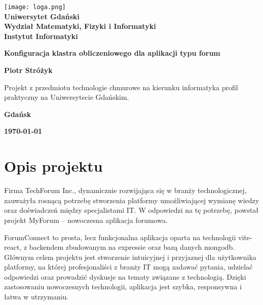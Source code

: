 \documentclass[12pt,a4paper]{article}
\newcommand{\hmwkTitle}{Konfiguracja klastra obliczeniowego dla aplikacji typu forum} %
\newcommand{\hmwkDueDate}{\today} %
\newcommand{\hmwkAuthorName}{Piotr Stróżyk} %
\begin{document}
\begin{titlepage}
    \vfill
	\begin{center}
	\hspace*{-1cm}
	\vspace*{0.5cm}
    \texttt{[image: loga.png]}\\
	\textbf{Uniwersytet Gdański \\ [0.05cm]Wydział Matematyki, Fizyki i Informatyki \\ [0.05cm] Instytut Informatyki}

	\vspace{0.6cm}
	\vspace{4cm}
	{\huge \textbf{\hmwkTitle}}\vspace{8mm}
	
	{\large \textbf{\hmwkAuthorName}}\\[3cm]
	
		\hspace{.45\textwidth} %
	   \begin{minipage}{.5\textwidth}
	   Projekt z przedmiotu technologie chmurowe na kierunku informatyka profil praktyczny na Uniwersytecie Gdańskim.\\[0.1cm]
	  \end{minipage}
	  \vfill
	
	\textbf{Gdańsk}
	
	\textbf{\hmwkDueDate}
	\end{center}
	
\end{titlepage}

\newpage
\setcounter{secnumdepth}{5}
\tableofcontents
\newpage

\section{Opis projektu}
\label{sec:Project}

Firma TechForum Inc., dynamicznie rozwijająca się w branży technologicznej, zauważyła rosnącą potrzebę stworzenia platformy umożliwiającej wymianę wiedzy oraz doświadczeń między specjalistami IT. W odpowiedzi na tę potrzebę, powstał projekt MyForum – nowoczesna aplikacja forumowa.

ForumConnect to prosta, lecz funkcjonalna aplikacja oparta na technologii vite-react, z backendem zbudowanym na expressie oraz bazą danych mongodb. Głównym celem projektu jest stworzenie intuicyjnej i przyjaznej dla użytkownika platformy, na której profesjonaliści z branży IT mogą zadawać pytania, udzielać odpowiedzi oraz prowadzić dyskusje na tematy związane z technologią. Dzięki zastosowaniu nowoczesnych technologii, aplikacja jest szybka, responsywna i łatwa w utrzymaniu.
\end{document}
